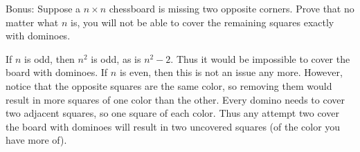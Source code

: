 \begin{questions}
\begin{parts}
\begin{center}
  \end{center}

  \end{parts}


  \question[4] Bonus: Suppose a $n\times n$ chessboard is missing two opposite corners.  Prove that no matter what $n$ is, you will not be able to cover the remaining squares exactly with dominoes.

  \begin{center}
  \end{center}

  \begin{solution}
  If $n$ is odd, then $n^2$ is odd, as is $n^2 - 2$.  Thus it would be impossible to cover the board with dominoes.  If $n$ is even, then this is not an issue any more.  However, notice that the opposite squares are the same color, so removing them would result in more squares of one color than the other.  Every domino needs to cover two adjacent squares, so one square of each color.  Thus any attempt two cover the board with dominoes will result in two uncovered squares (of the color you have more of).
  \end{solution}
\end{questions}



